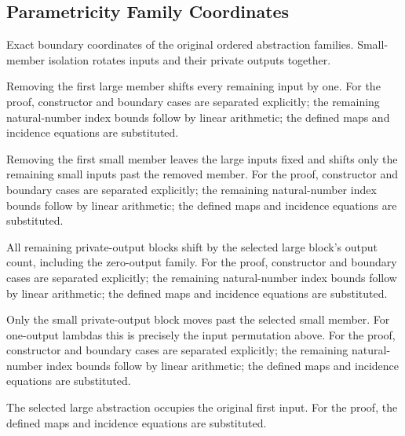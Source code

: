 \subsection{Parametricity Family Coordinates}
Exact boundary coordinates of the original ordered abstraction families. Small-member isolation rotates inputs and their private outputs together.

Removing the first large member shifts every remaining input by one.
For the proof, constructor and boundary cases are separated explicitly; the remaining natural-number index bounds follow by linear arithmetic; the defined maps and incidence equations are substituted.
\par{}

Removing the first small member leaves the large inputs fixed and shifts only the remaining small inputs past the removed member.
For the proof, constructor and boundary cases are separated explicitly; the remaining natural-number index bounds follow by linear arithmetic; the defined maps and incidence equations are substituted.
\par{}

All remaining private-output blocks shift by the selected large block's output count, including the zero-output family.
For the proof, constructor and boundary cases are separated explicitly; the remaining natural-number index bounds follow by linear arithmetic; the defined maps and incidence equations are substituted.
\par{}

Only the small private-output block moves past the selected small member. For one-output lambdas this is precisely the input permutation above.
For the proof, constructor and boundary cases are separated explicitly; the remaining natural-number index bounds follow by linear arithmetic; the defined maps and incidence equations are substituted.
\par{}

The selected large abstraction occupies the original first input.
For the proof, the defined maps and incidence equations are substituted.
\par{}

